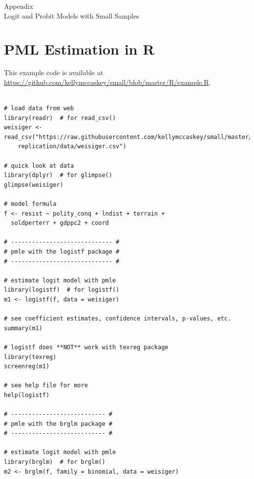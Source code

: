 \documentclass[12pt]{article}
\begin{document}
\singlespace
\normalsize


%

\newpage
\begin{appendix}
\begin{center}
{\LARGE Appendix}\\
\vspace{3mm}
{\large Logit and Probit Models with Small Samples}\\\vspace{2mm}
\end{center}

\section{PML Estimation in R}\label{sec:pmle-in-R}

This example code is available at \href{https://github.com/kellymccaskey/small/blob/master/R/example.R}{https://github.com/kellymccaskey/small/blob/master/R/example.R}.

\begin{footnotesize}
\begin{verbatim}

# load data from web
library(readr)  # for read_csv()
weisiger <- read_csv("https://raw.githubusercontent.com/kellymccaskey/small/master/weisiger-
	replication/data/weisiger.csv")

# quick look at data
library(dplyr)  # for glimpse()
glimpse(weisiger)

# model formula
f <- resist ~ polity_conq + lndist + terrain +
  soldperterr + gdppc2 + coord

# ----------------------------- #
# pmle with the logistf package #
# ----------------------------- #

# estimate logit model with pmle
library(logistf)  # for logistf()
m1 <- logistf(f, data = weisiger)

# see coefficient estimates, confidence intervals, p-values, etc.
summary(m1)

# logistf does **NOT** work with texreg package
library(texreg)
screenreg(m1)

# see help file for more
help(logistf)

# --------------------------- #
# pmle with the brglm package #
# --------------------------- #

# estimate logit model with pmle
library(brglm)  # for brglm()
m2 <- brglm(f, family = binomial, data = weisiger)


\end{verbatim}
\end{footnotesize}
\end{appendix}
\end{document}
